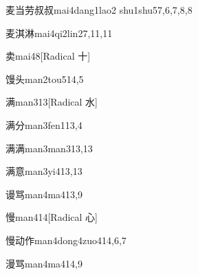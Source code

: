 \begin{entry}{麦当劳叔叔}{mai4dang1lao2 shu1shu5}{7,6,7,8,8}
\end{entry}

\begin{entry}{麦淇淋}{mai4qi2lin2}{7,11,11}
\end{entry}

\begin{entry}{卖}{mai4}{8}[Radical 十]
\end{entry}

\begin{entry}{馒头}{man2tou5}{14,5}
\end{entry}

\begin{entry}{满}{man3}{13}[Radical 水]
\end{entry}

\begin{entry}{满分}{man3fen1}{13,4}
\end{entry}

\begin{entry}{满满}{man3man3}{13,13}
\end{entry}

\begin{entry}{满意}{man3yi4}{13,13}
\end{entry}

\begin{entry}{谩骂}{man4ma4}{13,9}
\end{entry}

\begin{entry}{慢}{man4}{14}[Radical 心]
\end{entry}

\begin{entry}{慢动作}{man4dong4zuo4}{14,6,7}
\end{entry}

\begin{entry}{漫骂}{man4ma4}{14,9}
\end{entry}

